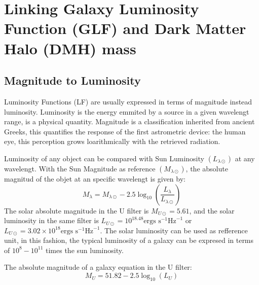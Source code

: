\section{Linking Galaxy Luminosity Function (GLF) and
  Dark Matter Halo (DMH) mass}




\subsection{Magnitude to Luminosity}

Luminosity Functions (LF) are usually expressed in terms of magnitude instead 
luminosity. Luminosity is the energy emmited by a source in a given wavelengt range, 
is a physical quantity. 
Magnitude is a classification inherited from ancient Greeks, this
quantifies the response of the first astrometric device: the human eye, this
perception grows loarithmically with the retrieved radiation.

Luminosity of any object can be compared with Sun Luminosity $(L_{\lambda
\odot})$ at any wavelengt. With the Sun Magnitude as reference
$(M_{\lambda \odot})$, the absolute magnitud of the objet  at an specific
wavelengt is given by: 
 \[ M_{\lambda} = M_{\lambda \odot} - 2.5 \log_{10}\left( 
\frac{L_\lambda}{L_{\lambda \odot}} \right) \]
  The solar absolute magnitude in the U filter is $M_{U\odot} = 5.61$,
and the solar luminosity in the same filter is $L_{U\odot} = 10^{18.48} 
\textrm{ergs s}^{-1}\textrm{Hz}^{-1}$ or $ L_{U\odot} = 3.02 \times 10^{18} 
\textrm{ergs s}^{-1}\textrm{Hz}^{-1}$. The solar luminosity can be used as
refference unit, in this fashion, the typical luminosity of a galaxy can be expresed in
terms of $10^{8}-10^{11}$ times the sun luminosity.

  The absolute magnitude of a galaxy equation in the U filter:
  \[ M_{U} = 51.82 - 2.5 \log_{10}(L_{U}) \]

